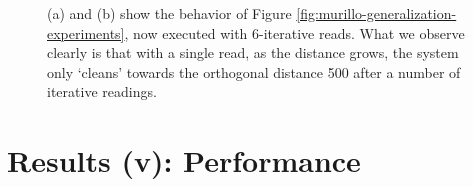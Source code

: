 \begin{figure}[h!]
  \centering


  \caption{(a) and (b) show the behavior of Figure \ref{fig:murillo-generalization-experiments}, now executed with 6-iterative reads. What we observe clearly is that with a single read, as the distance grows, the system only `cleans' towards the orthogonal distance 500 after a number of iterative readings.}
  \label{fig:murillo-generalization-experiments-6reads}
\end{figure}


\chapter{Results (v): Performance}


